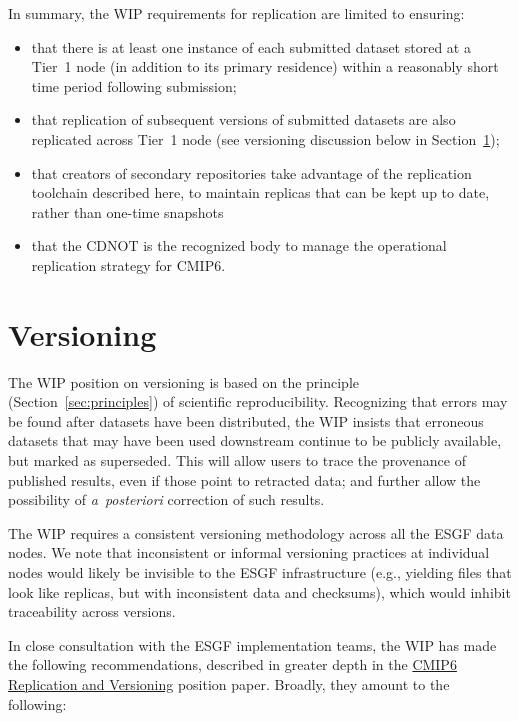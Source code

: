 \documentclass[gmd,manuscript]{copernicus}
\newcommand{\secref}[1] {\mbox{Section  \ref{sec:#1}}}
\begin{document}
In summary, the WIP requirements for replication are limited to
ensuring:

\begin{itemize}
\item that there is at least one instance of each submitted dataset
  stored at a Tier~1 node (in addition to its primary residence)
  within a reasonably short time period following submission;
\item that replication of subsequent versions of submitted datasets
  are also replicated across Tier~1 node (see versioning discussion
  below in \secref{version});
\item that creators of secondary repositories take advantage of the
  replication toolchain described here, to maintain replicas that can
  be kept up to date, rather than one-time snapshots
\item that the CDNOT is the recognized body to manage the operational
  replication strategy for CMIP6.
\end{itemize}

\section{Versioning}
\label{sec:version}

The WIP position on versioning is based on the principle
(\secref{principles}) of scientific reproducibility. Recognizing that
errors may be found after datasets have been distributed, the WIP
insists that erroneous datasets that may have been used downstream continue
to be publicly available, but marked as superseded. This will allow
users to trace the provenance of published results, even if those
point to retracted data; and further allow the possibility of 
\emph{a~posteriori} correction of such results.

The WIP requires a consistent versioning methodology across all the
ESGF data nodes. We note that inconsistent or informal versioning
practices at individual nodes would likely be invisible to the ESGF
infrastructure (e.g., yielding files that look like replicas, but with 
inconsistent data and checksums), which would inhibit traceability 
across versions.

In close consultation with the ESGF implementation teams, the WIP has
made the following recommendations, described in greater depth in the
\href{https://goo.gl/Bs4Qou}{CMIP6 Replication and Versioning}
position paper. Broadly, they amount to the following:
\end{document}
